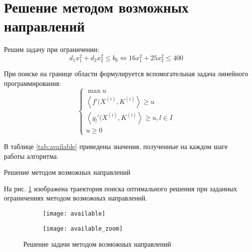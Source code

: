 \newpage

\section{Решение методом возможных направлений}

Решим задачу при ограничении:
\begin{equation*}
d_1 x_1^2 + d_2 x_2^2 \leq b_6
\Longleftrightarrow
16 x_1^2 + 25 x_2^2 \leq 400
\end{equation*}

При поиске на границе области формулируется вспомогательная задача линейного программирования:
\begin{equation*}
\begin{cases}
\max u \\
\left\langle f'(X^{(i)}, K^{(i)} \right\rangle \geq u \\
\left\langle g_l'(X^{(i)}, K^{(i)} \right\rangle \geq u, l \in I \\
u \geq 0
\end{cases}
\end{equation*}

В таблице \ref{tab:available} приведены значения, полученные на каждом шаге работы алгоритма.
\begin{table}[H]
\begin{center}
	   \caption{Решение методом возможных направлений}
	   \label{tab:available}
\end{center}
\end{table}

На рис. \ref{fig:available} изображена траектория поиска оптимального решения при заданных ограничениях методом возможных направлений.
\vspace{-0.5cm}
\begin{figure}[H]
\begin{center}
	\begin{subfigure}[b]{0.49\textwidth}
		\texttt{[image: available]}
	\end{subfigure}
	\begin{subfigure}[b]{0.49\textwidth}
		\texttt{[image: available\_zoom]}
	\end{subfigure}
	\caption{Решение задачи методом возможных направлений}
	\label{fig:available}
\end{center}
\end{figure}

